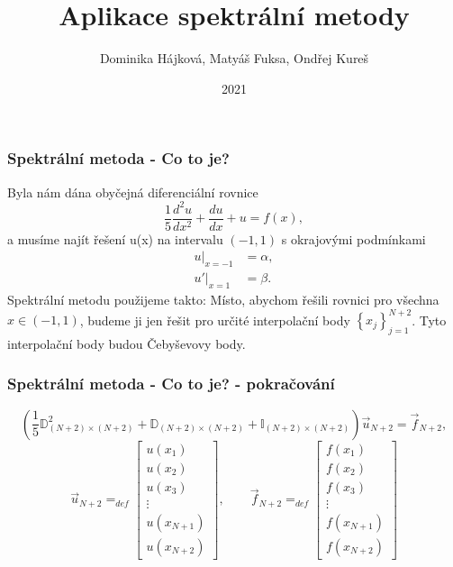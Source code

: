 \documentclass[xcolor=table]{beamer}
\title{Aplikace spektrální metody}
\author{Dominika Hájková, Matyáš Fuksa, Ondřej Kureš}
\institute{Stormtrooperz}
\date{2021}
\begin{document}
\frame{\titlepage}
\begin{frame}
\frametitle{Spektrální metoda - Co to je?}
Byla nám dána obyčejná diferenciální rovnice
\begin{equation*}
\frac{1}{5}\frac{d^2u}{dx^2}+\frac{du}{dx}+u=f(x),
\end{equation*}
a musíme najít řešení u(x) na intervalu $(-1,1)$ s okrajovými podmínkami
\begin{align*}
\left. u \right|_{x=-1} &= \alpha, \\
\left. u' \right|_{x=1} &= \beta.
\end{align*}
Spektrální metodu použijeme takto: Místo, abychom řešili rovnici pro všechna $x \in (-1,1)$, budeme ji jen řešit pro určité interpolační body $\left\{ x_j \right\}_{j=1}^{N+2}$. Tyto interpolační body budou Čebyševovy body. 
\end{frame}

\begin{frame}
\frametitle{Spektrální metoda - Co to je? - pokračování}
\begin{equation*}
  \left(
    \frac{1}{5}
    \mathbb{D}_{\left(N + 2\right)\times \left(N + 2\right)}^2
    +
    \mathbb{D}_{\left(N + 2\right)\times \left(N + 2\right)}
    +
    \mathbb{I}_{\left(N + 2\right) \times \left(N + 2\right)}
  \right)
  \vec{u}_{N + 2}
  =
  \vec{f}_{N + 2}
  ,
\end{equation*}
\begin{equation*}
  \label{eq:55}
  \vec{u}_{N + 2}
  =_{def}
  \begin{bmatrix}
    u(x_1) \\
    u(x_2) \\
    u(x_3) \\
    \vdots \\
    u(x_{N + 1}) \\
    u(x_{N + 2})
  \end{bmatrix}
  ,
  \qquad
  \vec{f}_{N + 2} = _{def}
  \begin{bmatrix}
    f(x_1) \\
    f(x_2) \\
    f(x_3) \\
    \vdots \\
    f(x_{N + 1}) \\
    f(x_{N + 2})
  \end{bmatrix}
\end{equation*}
\end{frame}
\end{document}
